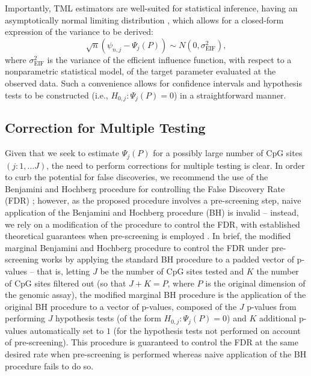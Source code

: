 \documentclass[9pt,a4paper,]{extarticle}
\theoremstyle{definition}
\theoremstyle{definition}
\theoremstyle{definition}
\theoremstyle{remark}
\begin{document}
Importantly, TML estimators are well-suited for statistical inference, having an
asymptotically normal limiting distribution \citep[
\citet{vdl2006targeted}]{tsiatis2007semiparametric}, which allows for a closed-form expression of the variance
to be derived:
\begin{equation}\label{eqn:lim_psi}
  \sqrt{n}(\psi_{n, j} - \Psi_j(P)) \sim N(0, \sigma_{\text{EIF}}^2),
\end{equation}
where \(\sigma_{\text{EIF}}^2\) is the variance of the efficient influence
function, with respect to a nonparametric statistical model, of the target
parameter evaluated at the observed data. Such a convenience allows for
confidence intervals and hypothesis tests to be constructed (i.e.,
\(H_{0, j}: \Psi_j(P) = 0\)) in a straightforward manner.

\hypertarget{correction-for-multiple-testing}{%
\subsection{Correction for Multiple Testing}\label{correction-for-multiple-testing}}

Given that we seek to estimate \(\Psi_j(P)\) for a possibly large number of CpG
sites \((j: 1, \ldots J)\), the need to perform corrections for multiple testing
is clear. In order to curb the potential for false discoveries, we recommend the
use of the Benjamini and Hochberg procedure for controlling the False Discovery
Rate (FDR) \citep{benjamini1995controlling}; however, as the proposed procedure
involves a pre-screening step, naive application of the Benjamini and Hochberg
procedure (BH) is invalid -- instead, we rely on a modification of the procedure
to control the FDR, with established theoretical guarantees when pre-screening
is employed \citep{tuglus2009modified}. In brief, the modified marginal Benjamini and
Hochberg procedure to control the FDR under pre-screening works by applying the
standard BH procedure to a padded vector of p-values -- that is, letting \(J\) be
the number of CpG sites tested and \(K\) the number of CpG sites filtered out (so
that \(J + K = P\), where \(P\) is the original dimension of the genomic assay), the
modified marginal BH procedure is the application of the original BH procedure
to a vector of p-values, composed of the \(J\) p-values from performing \(J\)
hypothesis tests (of the form \(H_{0, j}: \Psi_j(P) = 0\)) and \(K\) additional
p-values automatically set to \(1\) (for the hypothesis tests not performed on
account of pre-screening). This procedure is guaranteed to control the FDR at
the same desired rate when pre-screening is performed whereas naive application
of the BH procedure fails to do so.

\renewcommand\refname{References}
{\small}
\end{document}
